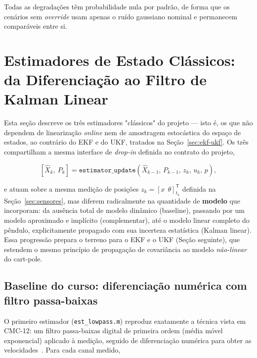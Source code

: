 \documentclass[brazil, 12pt]{article}
\begin{document}
Todas as degradações têm probabilidade nula por padrão, de forma que os cenários
sem \emph{override} usam apenas o ruído gaussiano nominal e permanecem
comparáveis entre si.

\section{Estimadores de Estado Clássicos: da Diferenciação ao Filtro de Kalman Linear}
\label{sec:estimadores-classicos}

Esta seção descreve os três estimadores "clássicos" do projeto — isto é, os que
não dependem de linearização \emph{online} nem de amostragem estocástica do
espaço de estados, ao contrário do EKF e do UKF, tratados na
Seção~\ref{sec:ekf-ukf}. Os três compartilham a mesma interface de \emph{drop-in} definida
no contrato do projeto,

\[
[\hat X_k,\ P_k] = \texttt{estimator\_update}(\hat X_{k-1},\, P_{k-1},\, z_k,\, u_k,\, p),
\]

e atuam sobre a mesma medição de posições $z_k=[x\ \ \theta]^{\mathsf T}_{t_k}$
definida na Seção~\ref{sec:sensores}, mas diferem radicalmente na quantidade de
\textbf{modelo} que incorporam: da ausência total de modelo dinâmico (baseline),
passando por um modelo aproximado e implícito (complementar), até o modelo
linear completo do pêndulo, explicitamente propagado com sua incerteza
estatística (Kalman linear). Essa progressão prepara o terreno para o EKF e o
UKF (Seção seguinte), que estendem o mesmo princípio de propagação de
covariância ao modelo \emph{não-linear} do cart-pole.

\subsection{Baseline do curso: diferenciação numérica com filtro passa-baixas}
\label{sec:baseline-lowpass}

O primeiro estimador (\texttt{est\_lowpass.m}) reproduz exatamente a técnica
vista em CMC-12: um filtro passa-baixas digital de primeira ordem (média móvel
exponencial) aplicado à medição, seguido de diferenciação numérica para obter as
velocidades~\cite{oppenheim}. Para cada canal medido,
\end{document}
